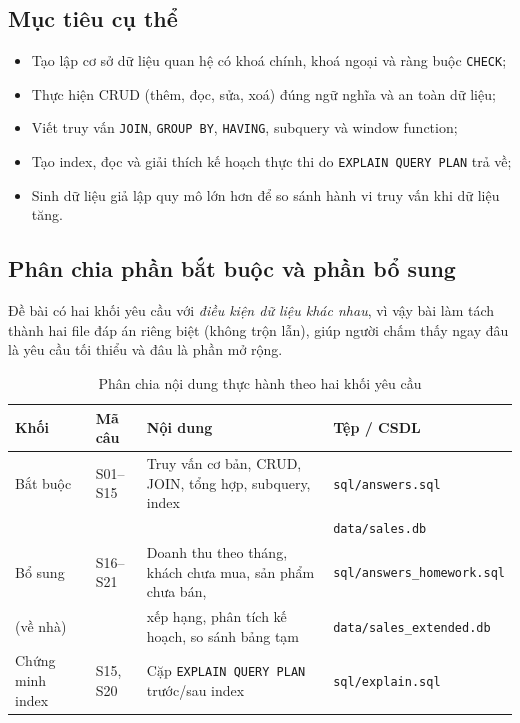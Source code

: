 \documentclass[12pt,a4paper]{article}
\newcommand{\code}[1]{\texttt{\small #1}}
\begin{document}
\subsection{Mục tiêu cụ thể}

\begin{itemize}[leftmargin=1.2cm,itemsep=2pt]
  \item Tạo lập cơ sở dữ liệu quan hệ có khoá chính, khoá ngoại và ràng buộc \code{CHECK};
  \item Thực hiện CRUD (thêm, đọc, sửa, xoá) đúng ngữ nghĩa và an toàn dữ liệu;
  \item Viết truy vấn \code{JOIN}, \code{GROUP BY}, \code{HAVING}, subquery và window function;
  \item Tạo index, đọc và giải thích kế hoạch thực thi do \code{EXPLAIN QUERY PLAN} trả về;
  \item Sinh dữ liệu giả lập quy mô lớn hơn để so sánh hành vi truy vấn khi dữ liệu tăng.
\end{itemize}

\subsection{Phân chia phần bắt buộc và phần bổ sung}

Đề bài có hai khối yêu cầu với \emph{điều kiện dữ liệu khác nhau}, vì vậy bài làm tách thành hai
file đáp án riêng biệt (không trộn lẫn), giúp người chấm thấy ngay đâu là yêu cầu tối thiểu và
đâu là phần mở rộng.

\begin{table}[H]
\centering
\caption{Phân chia nội dung thực hành theo hai khối yêu cầu}
\label{tab:split}
\small
\begin{tabularx}{\linewidth}{@{}l l X l@{}}
\toprule
\textbf{Khối} & \textbf{Mã câu} & \textbf{Nội dung} & \textbf{Tệp / CSDL} \\
\midrule
Bắt buộc & S01--S15 & Truy vấn cơ bản, CRUD, JOIN, tổng hợp, subquery, index & \code{sql/answers.sql} \\
         &         &                                                                 & \code{data/sales.db} \\
Bổ sung  & S16--S21 & Doanh thu theo tháng, khách chưa mua, sản phẩm chưa bán, & \code{sql/answers\_homework.sql} \\
(về nhà) &         & xếp hạng, phân tích kế hoạch, so sánh bảng tạm             & \code{data/sales\_extended.db} \\
Chứng minh index & S15, S20 & Cặp \code{EXPLAIN QUERY PLAN} trước/sau index & \code{sql/explain.sql} \\
\bottomrule
\end{tabularx}
\end{table}
\end{document}
